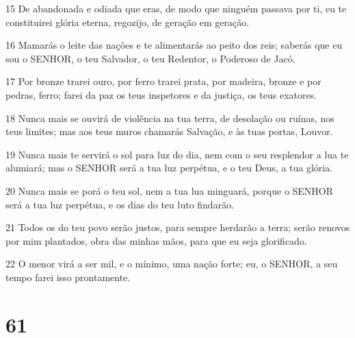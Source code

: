 \par 15 De abandonada e odiada que eras, de modo que ninguém passava por ti, eu te constituirei glória eterna, regozijo, de geração em geração.
\par 16 Mamarás o leite das nações e te alimentarás ao peito dos reis; saberás que eu sou o SENHOR, o teu Salvador, o teu Redentor, o Poderoso de Jacó.
\par 17 Por bronze trarei ouro, por ferro trarei prata, por madeira, bronze e por pedras, ferro; farei da paz os teus inspetores e da justiça, os teus exatores.
\par 18 Nunca mais se ouvirá de violência na tua terra, de desolação ou ruínas, nos teus limites; mas aos teus muros chamarás Salvação, e às tuas portas, Louvor.
\par 19 Nunca mais te servirá o sol para luz do dia, nem com o seu resplendor a lua te alumiará; mas o SENHOR será a tua luz perpétua, e o teu Deus, a tua glória.
\par 20 Nunca mais se porá o teu sol, nem a tua lua minguará, porque o SENHOR será a tua luz perpétua, e os dias do teu luto findarão.
\par 21 Todos os do teu povo serão justos, para sempre herdarão a terra; serão renovos por mim plantados, obra das minhas mãos, para que eu seja glorificado.
\par 22 O menor virá a ser mil, e o mínimo, uma nação forte; eu, o SENHOR, a seu tempo farei isso prontamente.

\chapter{61}

